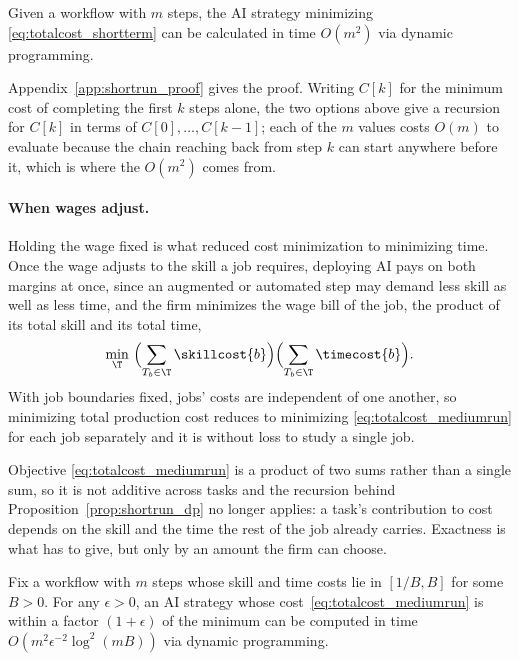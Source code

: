 \begin{proposition}
\label{prop:shortrun_dp}
Given a workflow with $m$ steps, the AI strategy minimizing \eqref{eq:totalcost_shortterm} can be calculated in time $O(m^2)$ via dynamic programming.
\end{proposition}

Appendix~\ref{app:shortrun_proof} gives the proof.
Writing $C[k]$ for the minimum cost of completing the first $k$ steps alone, the two options above give a recursion for $C[k]$ in terms of $C[0], \dotsc, C[k-1]$; each of the $m$ values costs $O(m)$ to evaluate because the chain reaching back from step $k$ can start anywhere before it, which is where the $O(m^2)$ comes from.

\paragraph{When wages adjust.}
Holding the wage fixed is what reduced cost minimization to minimizing time.
Once the wage adjusts to the skill a job requires, deploying AI pays on both margins at once, since an augmented or automated step may demand less skill as well as less time, and the firm minimizes the wage bill of the job, the product of its total skill and its total time,
\begin{align}
\label{eq:totalcost_mediumrun}
\min_{\T} \ \Bigl(\sum_{T_b \in \T} \skillcost{b}\Bigr)\Bigl(\sum_{T_b \in \T} \timecost{b}\Bigr).
\end{align}
With job boundaries fixed, jobs' costs are independent of one another, so minimizing total production cost reduces to minimizing \eqref{eq:totalcost_mediumrun} for each job separately and it is without loss to study a single job.

Objective \eqref{eq:totalcost_mediumrun} is a product of two sums rather than a single sum, so it is not additive across tasks and the recursion behind Proposition~\ref{prop:shortrun_dp} no longer applies: a task's contribution to cost depends on the skill and the time the rest of the job already carries.
Exactness is what has to give, but only by an amount the firm can choose.

\begin{proposition}
\label{prop:mediumrun_dp}
Fix a workflow with $m$ steps whose skill and time costs lie in $[1/B, B]$ for some $B > 0$.
For any $\epsilon > 0$, an AI strategy whose cost~\eqref{eq:totalcost_mediumrun} is within a factor $(1+\epsilon)$ of the minimum can be computed in time $O(m^2 \epsilon^{-2} \log^2(mB))$ via dynamic programming.
\end{proposition}

